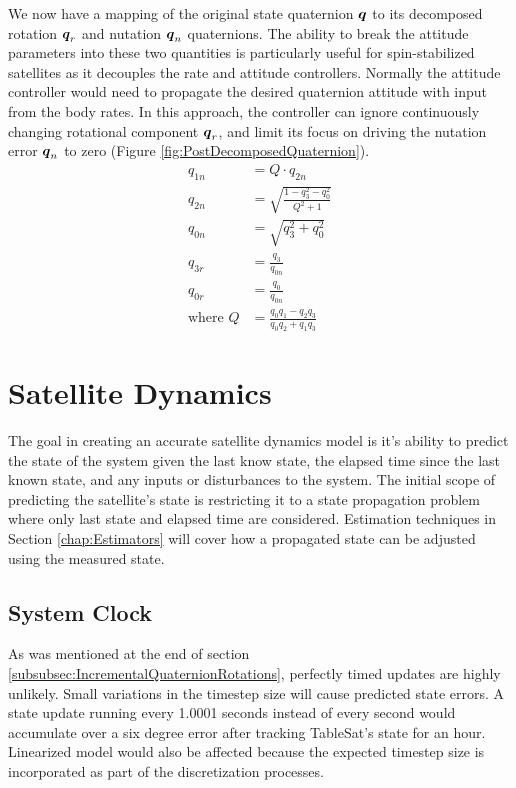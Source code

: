 We now have a mapping of the original state quaternion $\boldsymbol{q}$ to its decomposed rotation $\boldsymbol{q}_r$ and nutation $\boldsymbol{q}_n$ quaternions.  The ability to break the attitude parameters into these two quantities is particularly useful for spin-stabilized satellites as it decouples the rate and attitude controllers.  Normally the attitude controller would need to propagate the desired quaternion attitude with input from the body rates. In this approach, the controller can ignore continuously changing rotational component $\boldsymbol{q}_r$, and limit its focus on driving the nutation error $\boldsymbol{q}_n$ to zero (Figure \ref{fig:PostDecomposedQuaternion}).
\begin{subequations}
  \begin{align}
    q_{1n} &= Q \cdot q_{2n} \\
    q_{2n} &= \sqrt{ \frac{1  - q_3^2 - q_0^2}{Q^2 + 1} }\\
    q_{0n} &= \sqrt{q_3^2 + q_0^2} \\
    q_{3r} &= \frac{q_3}{q_{0n}} \\
    q_{0r} &= \frac{q_0}{q_{0n}} \\
    \text{where } Q &= \frac{q_{0}q_{1} - q_{2}q_{3}}{q_{0}q_{2} + q_{1}q_{3}}
  \end{align}
  \label{eqn:quaternion_decomposition_derivation}
\end{subequations}


\section{Satellite Dynamics}
\label{sec:SatelliteDynamics}

The goal in creating an accurate satellite dynamics model is it's ability to predict the state of the system given the last know state, the elapsed time since the last known state, and any inputs or disturbances to the system.  The initial scope of predicting the satellite's state is restricting it to a state propagation problem where only last state and elapsed time are considered.  Estimation techniques in Section \ref{chap:Estimators} will cover how a propagated state can be adjusted using the measured state.

\subsection{System Clock}
\label{subsec:SystemClock}

As was mentioned at the end of section \ref{subsubsec:IncrementalQuaternionRotations}, perfectly timed updates are highly unlikely.  Small variations in the timestep size will cause predicted state errors.  A state update running every 1.0001 seconds instead of every second would accumulate over a six degree error after tracking TableSat's state for an hour.  Linearized model would also be affected because the expected timestep size is incorporated as part of the discretization processes.

